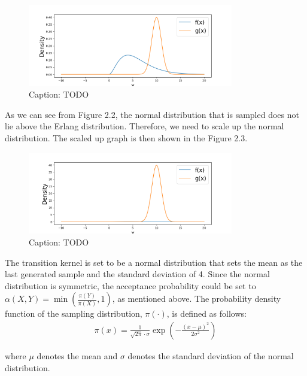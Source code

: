 \begin{figure}
    \centering
    \includegraphics[width=0.8\textwidth]{figures/mcmc_example/first_step.png}
    \captionsetup{width=.8\textwidth}
    \caption{Caption: TODO}
    \label{fig:enter-label}
\end{figure}


As we can see from Figure 2.2, the normal distribution that is sampled does not lie above the Erlang distribution. Therefore, we need to scale up the normal distribution. The scaled up graph is then shown in the Figure 2.3.

\begin{figure}
    \centering
    \includegraphics[width=0.8\textwidth]{figures/mcmc_example/second_step.png}
    \captionsetup{width=.8\textwidth}
    \caption{Caption: TODO}
    \label{fig:enter-label}
\end{figure}



The transition kernel is set to be a normal distribution that sets the mean as the last generated sample and the standard deviation of 4. Since the normal distribution is symmetric, the acceptance probability could be set to $\alpha(X, Y) = \min (\frac{\pi(Y)}{\pi(X)}, 1)$, as mentioned above. The probability density function of the sampling distribution, $\pi(\cdot)$, is defined as follows:
\begin{align}
\pi(x) = \frac{1}{\sqrt{2\pi} \cdot \sigma}\exp(-\frac{(x-\mu)^2}{2\sigma^2})
\end{align}

where $\mu$ denotes the mean and $\sigma$ denotes the standard deviation of the normal distribution.\linebreak\cite{densityFunction}

